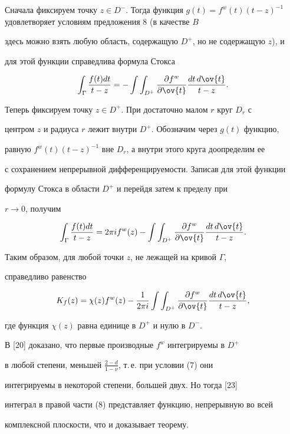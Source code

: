 \begin{pf}


Сначала фиксируем точку $z\in D^-$. Тогда функция $g(t)


= f^{w}(t)(t - z)^{-1}$ удовлетворяет условиям предложения 8 (в качестве $B$


здесь можно взять любую область, содержащую $D^+$, но не содержащую $z$), и


для этой функции справедлива формула Стокса


$$


\int_{\Gamma}{\frac{f(t)dt}{t-z}} = - \int\int_{D^{+}}


{\frac{\partial f^{w}}{\partial\ov{t}}\frac{dt\,d\ov{t}}{t-z}}.


$$


Теперь фиксируем точку $z\in D^+$. При достаточно малом $r$ круг $D_r$ с


центром $z$ и радиуса $r$ лежит внутри $D^+$. Обозначим через $g(t)$ функцию,


равную $f^{w}(t)(t - z)^{-1}$ вне $D_r$, а внутри этого круга доопределим ее


с сохранением непрерывной дифференцируемости. Записав для этой функции


формулу Стокса в области $D^+$ и перейдя затем к пределу при


$r\to 0$, получим


$$


\int_{\Gamma}{\frac{f(t)dt}{t-z}} = 2\pi if^{w}(z) - \int\int_{D^{+}}


{\frac{\partial f^{w}}{\partial\ov{t}}\frac{dt\,d\ov{t}}{t-z}}.


$$


Таким образом, для любой точки $z$, не лежащей на кривой $\Gamma$,


справедливо равенство


\begin{equation}


K_{f}(z) = \chi (z)f^{w}(z) - \frac{1}{2\pi i}\int\int_{D^{+}}


{\frac{\partial f^{w}}{\partial\ov{t}}\frac{dt\,d\ov{t}}{t-z}},


\end{equation}


где функция $\chi (z)$ равна единице в $D^+$ и нулю в $D^-$.


В [20] доказано, что первые производные $f^w$ интегрируемы в $D^+$


в любой степени, меньшей $\frac{2-d}{1-\nu}$, т.\,е. при условии (7) они


интегрируемы в некоторой степени, большей двух. Но тогда [23]


интеграл в правой части (8) представляет функцию, непрерывную во всей


комплексной плоскости, что и доказывает теорему.


\end{pf}





